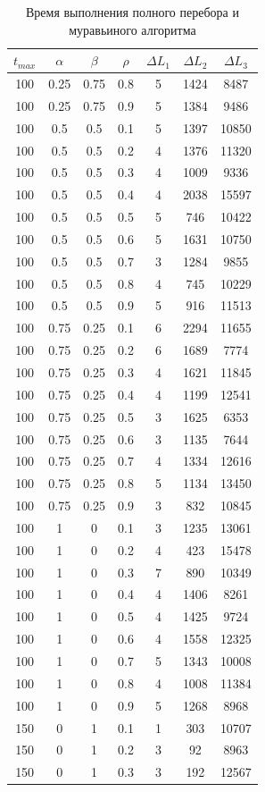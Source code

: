 \documentclass[a4paper,oneside,14pt]{extreport}
\begin{document}
\begin{table}[H]
\begin{center}
	\caption[]{\label{tbl:only} Время выполнения полного перебора и муравьиного алгоритма}
	\begin{tabular}{|c|c|c|c|c|c|c|}
		\hline
		$t_{max}$ & $\alpha$ & $\beta$& $\rho$ & $\Delta L_{1}$ & $\Delta L_{2}$ & $\Delta L_{3}$\\
		\hline
		100 & 0.25 & 0.75 & 0.8 & 5 & 1424 & 8487 \\
		100 & 0.25 & 0.75 & 0.9 & 5 & 1384 & 9486 \\
		100 & 0.5 & 0.5 & 0.1 & 5 & 1397 & 10850 \\
		100 & 0.5 & 0.5 & 0.2 & 4 & 1376 & 11320 \\
		100 & 0.5 & 0.5 & 0.3 & 4 & 1009 & 9336 \\
		100 & 0.5 & 0.5 & 0.4 & 4 & 2038 & 15597 \\
		100 & 0.5 & 0.5 & 0.5 & 5 & 746 & 10422 \\
		100 & 0.5 & 0.5 & 0.6 & 5 & 1631 & 10750 \\
		100 & 0.5 & 0.5 & 0.7 & 3 & 1284 & 9855 \\
		100 & 0.5 & 0.5 & 0.8 & 4 & 745 & 10229 \\
		100 & 0.5 & 0.5 & 0.9 & 5 & 916 & 11513 \\
		100 & 0.75 & 0.25 & 0.1 & 6 & 2294 & 11655 \\
		100 & 0.75 & 0.25 & 0.2 & 6 & 1689 & 7774 \\
		100 & 0.75 & 0.25 & 0.3 & 4 & 1621 & 11845 \\
		100 & 0.75 & 0.25 & 0.4 & 4 & 1199 & 12541 \\
		100 & 0.75 & 0.25 & 0.5 & 3 & 1625 & 6353 \\
		100 & 0.75 & 0.25 & 0.6 & 3 & 1135 & 7644 \\
		100 & 0.75 & 0.25 & 0.7 & 4 & 1334 & 12616 \\
		100 & 0.75 & 0.25 & 0.8 & 5 & 1134 & 13450 \\
		100 & 0.75 & 0.25 & 0.9 & 3 & 832 & 10845 \\
		100 & 1 & 0 & 0.1 & 3 & 1235 & 13061 \\
		100 & 1 & 0 & 0.2 & 4 & 423 & 15478 \\
		100 & 1 & 0 & 0.3 & 7 & 890 & 10349 \\
		100 & 1 & 0 & 0.4 & 4 & 1406 & 8261 \\
		100 & 1 & 0 & 0.5 & 4 & 1425 & 9724 \\
		100 & 1 & 0 & 0.6 & 4 & 1558 & 12325 \\
		100 & 1 & 0 & 0.7 & 5 & 1343 & 10008 \\
		100 & 1 & 0 & 0.8 & 4 & 1008 & 11384 \\
		100 & 1 & 0 & 0.9 & 5 & 1268 & 8968 \\
		150 & 0 & 1 & 0.1 & 1 & 303 & 10707 \\
		150 & 0 & 1 & 0.2 & 3 & 92 & 8963 \\
		150 & 0 & 1 & 0.3 & 3 & 192 & 12567 \\
		\hline
		
	\end{tabular}
\end{center}
\end{table}
\end{document}
